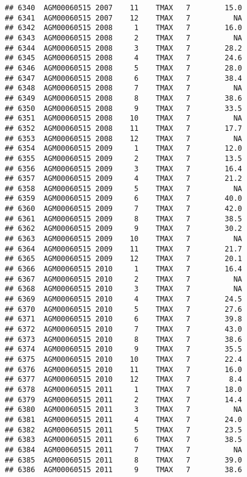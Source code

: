 \documentclass{article}\usepackage[]{graphicx}\usepackage[]{color}
\makeatletter
\newenvironment{kframe}{%
 \def\at@end@of@kframe{}%
 \ifinner\ifhmode%
  \def\at@end@of@kframe{\end{minipage}}%
  \begin{minipage}{\columnwidth}%
 \fi\fi%
 \def\FrameCommand##1{\hskip\@totalleftmargin \hskip-\fboxsep
 \colorbox{shadecolor}{##1}\hskip-\fboxsep
     \hskip-\linewidth \hskip-\@totalleftmargin \hskip\columnwidth}%
 \MakeFramed {\advance\hsize-\width
   \@totalleftmargin\z@ \linewidth\hsize
   \@setminipage}}%
 {\par\unskip\endMakeFramed%
 \at@end@of@kframe}
\newenvironment{knitrout}{}{} %
\makeatother
\begin{document}
\begin{knitrout}
\begin{kframe}
\begin{verbatim}
## 6340  AGM00060515 2007    11    TMAX   7        15.0
## 6341  AGM00060515 2007    12    TMAX   7          NA
## 6342  AGM00060515 2008     1    TMAX   7        16.0
## 6343  AGM00060515 2008     2    TMAX   7          NA
## 6344  AGM00060515 2008     3    TMAX   7        28.2
## 6345  AGM00060515 2008     4    TMAX   7        24.6
## 6346  AGM00060515 2008     5    TMAX   7        28.0
## 6347  AGM00060515 2008     6    TMAX   7        38.4
## 6348  AGM00060515 2008     7    TMAX   7          NA
## 6349  AGM00060515 2008     8    TMAX   7        38.6
## 6350  AGM00060515 2008     9    TMAX   7        33.5
## 6351  AGM00060515 2008    10    TMAX   7          NA
## 6352  AGM00060515 2008    11    TMAX   7        17.7
## 6353  AGM00060515 2008    12    TMAX   7          NA
## 6354  AGM00060515 2009     1    TMAX   7        12.0
## 6355  AGM00060515 2009     2    TMAX   7        13.5
## 6356  AGM00060515 2009     3    TMAX   7        16.4
## 6357  AGM00060515 2009     4    TMAX   7        21.2
## 6358  AGM00060515 2009     5    TMAX   7          NA
## 6359  AGM00060515 2009     6    TMAX   7        40.0
## 6360  AGM00060515 2009     7    TMAX   7        42.0
## 6361  AGM00060515 2009     8    TMAX   7        38.5
## 6362  AGM00060515 2009     9    TMAX   7        30.2
## 6363  AGM00060515 2009    10    TMAX   7          NA
## 6364  AGM00060515 2009    11    TMAX   7        21.7
## 6365  AGM00060515 2009    12    TMAX   7        20.1
## 6366  AGM00060515 2010     1    TMAX   7        16.4
## 6367  AGM00060515 2010     2    TMAX   7          NA
## 6368  AGM00060515 2010     3    TMAX   7          NA
## 6369  AGM00060515 2010     4    TMAX   7        24.5
## 6370  AGM00060515 2010     5    TMAX   7        27.6
## 6371  AGM00060515 2010     6    TMAX   7        39.8
## 6372  AGM00060515 2010     7    TMAX   7        43.0
## 6373  AGM00060515 2010     8    TMAX   7        38.6
## 6374  AGM00060515 2010     9    TMAX   7        35.5
## 6375  AGM00060515 2010    10    TMAX   7        22.4
## 6376  AGM00060515 2010    11    TMAX   7        16.0
## 6377  AGM00060515 2010    12    TMAX   7         8.4
## 6378  AGM00060515 2011     1    TMAX   7        18.0
## 6379  AGM00060515 2011     2    TMAX   7        14.4
## 6380  AGM00060515 2011     3    TMAX   7          NA
## 6381  AGM00060515 2011     4    TMAX   7        24.0
## 6382  AGM00060515 2011     5    TMAX   7        23.5
## 6383  AGM00060515 2011     6    TMAX   7        38.5
## 6384  AGM00060515 2011     7    TMAX   7          NA
## 6385  AGM00060515 2011     8    TMAX   7        39.0
## 6386  AGM00060515 2011     9    TMAX   7        38.6

\end{verbatim}
\end{kframe}
\end{knitrout}
\end{document}
